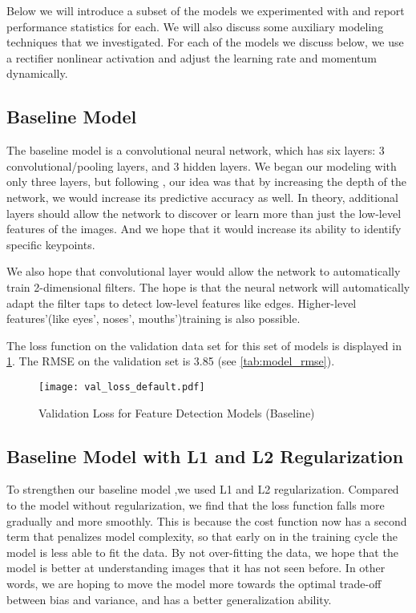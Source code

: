\documentclass{article}
\begin{document}
Below we will introduce a subset of the models we experimented with and report performance statistics for each. We will also discuss some auxiliary modeling techniques that we investigated. For each of the models we discuss below, we use a rectifier nonlinear activation and adjust the learning rate and momentum dynamically.

\subsection{Baseline Model}

The baseline model is a convolutional neural network, which has six layers: 3 convolutional/pooling layers, and 3 hidden layers. We began our modeling with only three layers, but following \cite[benlecun2007]{}, our idea was that by increasing the depth of the network, we would increase its predictive accuracy as well. In theory, additional layers should allow the network to discover or learn more than just the low-level features of the images. And we hope that it would increase its ability to identify specific keypoints.

We also hope that convolutional layer would allow the network to automatically train 2-dimensional filters. The hope is that the neural network will automatically adapt the filter taps to detect low-level features like edges. Higher-level features'(like eyes', noses', mouths')training is also possible.

The loss function on the validation data set for this set of models is displayed in \ref{fig:val_loss_default}. The RMSE on the validation set is 3.85 (see \ref{tab:model_rmse}).

\begin{figure}[!htb]
  \centering
  \caption{Validation Loss for Feature Detection Models (Baseline)}
  \texttt{[image: val\_loss\_default.pdf]}
  \label{fig:val_loss_default}
\end{figure}

\subsection{Baseline Model with L1 and L2 Regularization}

To strengthen our baseline model ,we used L1 and L2 regularization. Compared to the model without regularization, we find that the loss function falls more gradually and more smoothly. This is because the cost function now has a second term that penalizes model complexity, so that early on in the training cycle the model is less able to fit the data. By not over-fitting the data, we hope that the model is better at understanding images that it has not seen before. In other words, we are hoping to move the model more towards the optimal trade-off between bias and variance, and has a better generalization ability.
\end{document}
